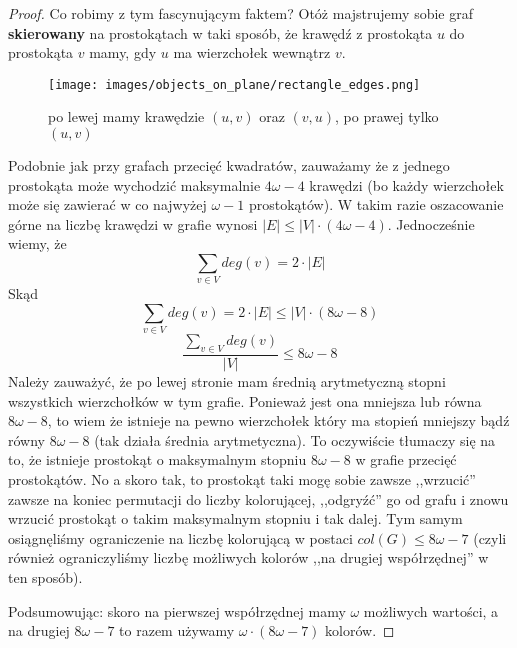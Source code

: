 \begin{proof}
        Co robimy z tym fascynującym faktem? Otóż majstrujemy sobie graf \textbf{skierowany} na prostokątach w taki sposób, 
        że krawędź z prostokąta $u$ do prostokąta $v$ mamy, gdy $u$ ma wierzchołek wewnątrz $v$.
        \begin{figure}[H]
            \centering
            \texttt{[image: images/objects\_on\_plane/rectangle\_edges.png]}

            \caption{po lewej mamy krawędzie $(u, v)$ oraz $(v, u)$, po prawej tylko $(u, v)$}
        \end{figure}
        
        Podobnie jak przy grafach przecięć kwadratów, zauważamy że z jednego prostokąta może wychodzić maksymalnie $4\omega - 4$ krawędzi (bo każdy wierzchołek może się zawierać w co najwyżej $\omega - 1$ prostokątów).
        W takim razie oszacowanie górne na liczbę krawędzi w grafie wynosi $|E| \leq |V| \cdot (4\omega - 4)$. Jednocześnie wiemy, że \begin{equation*}
          \sum_{v \in V} deg(v) = 2 \cdot |E|
      \end{equation*}
      Skąd
      \begin{equation*}
          \sum_{v \in V} deg(v) = 2 \cdot |E| \leq |V| \cdot (8 \omega - 8)
      \end{equation*}
      \begin{equation*}
          \frac{\sum_{v \in V} deg(v)}{|V|} \leq 8 \omega - 8
      \end{equation*}
      Należy zauważyć, że po lewej stronie mam średnią arytmetyczną stopni wszystkich wierzchołków w tym grafie. Ponieważ jest ona mniejsza lub równa $8 \omega - 8$, to wiem że istnieje na pewno wierzchołek który ma stopień mniejszy bądź równy $8\omega - 8$ (tak działa średnia arytmetyczna). To oczywiście tłumaczy się na to, że istnieje prostokąt o maksymalnym stopniu $8\omega - 8$ w grafie przecięć prostokątów. No a skoro tak, to prostokąt taki mogę sobie zawsze ,,wrzucić'' zawsze na koniec permutacji do liczby kolorującej, ,,odgryźć'' go od grafu i znowu wrzucić prostokąt o takim maksymalnym stopniu i tak dalej. Tym samym osiągnęliśmy ograniczenie na liczbę kolorującą w postaci $col(G) \leq 8\omega - 7$ (czyli również ograniczyliśmy liczbę możliwych kolorów ,,na drugiej współrzędnej'' w ten sposób). 
      
      Podsumowując: skoro na pierwszej współrzędnej mamy $\omega$ możliwych wartości, a na drugiej $8\omega - 7$ to razem używamy $\omega \cdot (8\omega - 7)$ kolorów.
      
    \end{proof}
